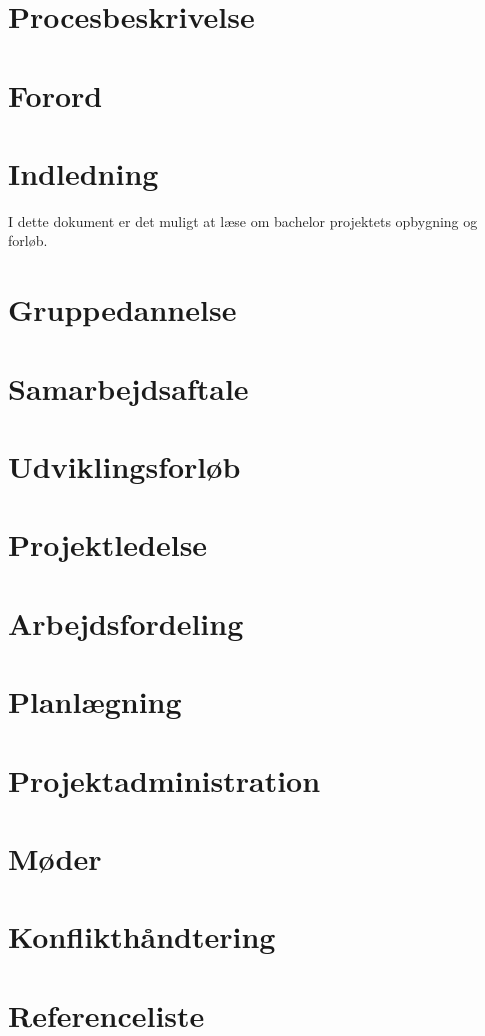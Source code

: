 \documentclass[main.tex]{subfiles}
\begin{document}
\chapter*{Procesbeskrivelse}
\newpage
\tableofcontents

 \chapter{Forord} 
 \chapter{Indledning}
 I dette dokument er det muligt at læse om bachelor projektets opbygning og forløb. 
 \chapter{Gruppedannelse}
 \chapter{Samarbejdsaftale}
 \chapter{Udviklingsforløb}
 \chapter{Projektledelse}
 \chapter{Arbejdsfordeling}
 \chapter{Planlægning}
 \chapter{Projektadministration}
 \chapter{Møder}
 \chapter{Konflikthåndtering}
 \chapter{Referenceliste}
 
\end{document}
